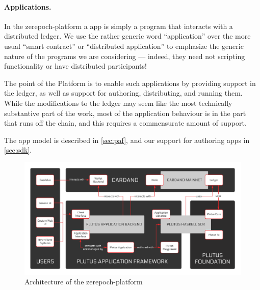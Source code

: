 \paragraph{Applications.}
In the \gls{zerepoch-platform} a \gls{app} is simply a program that interacts with a distributed ledger.
We use the rather generic word ``application'' over the more usual ``smart contract'' or ``distributed application'' to emphasize the generic nature of the programs we are considering --- indeed, they need not scripting functionality or have distributed participants!

The point of the Platform is to enable such applications by providing support in the ledger, as well as support for authoring, distributing, and running them.
While the modifications to the ledger may seem like the most technically substantive part of the work, most of the application behaviour is in the part that runs off the chain, and this requires a commensurate amount of support.

The \gls{app} model is described in \cref{sec:paf}, and our support for authoring \glspl{app} in \cref{sec:sdk}.

\begin{figure}[t]
  \centering
  \includegraphics[width=\textwidth]{platform-architecture.png}
  \caption{Architecture of the \gls{zerepoch-platform}}
  \label{fig:platform-architecture}
\end{figure}
